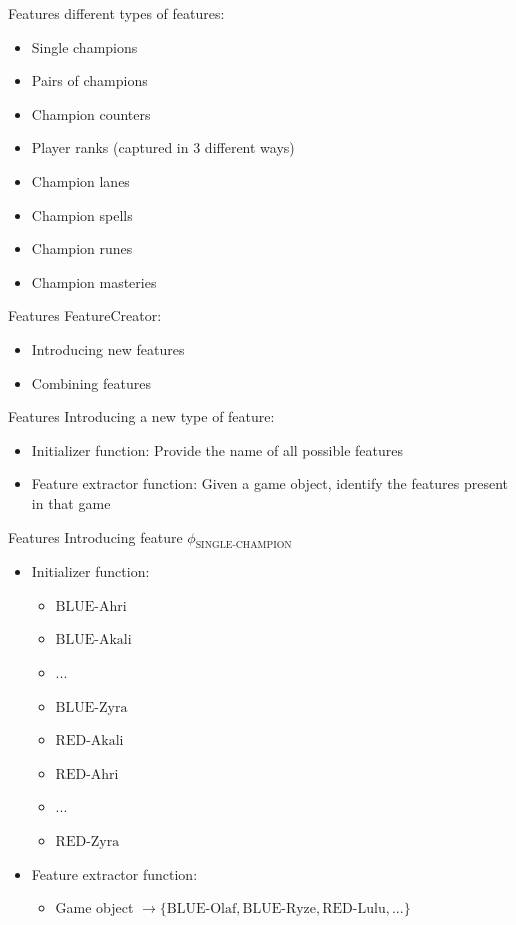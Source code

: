 \begin{frame}{Features}
 different types of features:\\
\begin{itemize}
\item Single champions
\item Pairs of champions
\item Champion counters
\item Player ranks (captured in 3 different ways)
\item Champion lanes
\item Champion spells
\item Champion runes
\item Champion masteries
\end{itemize}
\end{frame}


\begin{frame}{Features}
\centering
FeatureCreator:
\begin{itemize}
\item Introducing new features
\item Combining features
\end{itemize}
\end{frame}

\begin{frame}{Features}
Introducing a new type of feature:
\begin{itemize}
\item Initializer function: Provide the name of all possible features
\item Feature extractor function: Given a game object, identify the features present in that game
\end{itemize}
\end{frame}

\begin{frame}{Features}
Introducing feature $\phi_\text{SINGLE-CHAMPION}$
\begin{itemize}
\item Initializer function: 
	\begin{itemize}
	\item $\text{BLUE-Ahri}$
	\item $\text{BLUE-Akali}$
	\item ...
	\item $\text{BLUE-Zyra}$
	\item $\text{RED-Akali}$
	\item $\text{RED-Ahri}$
	\item ...
	\item $\text{RED-Zyra}$
	\end{itemize}
\item Feature extractor function:  
	\begin{itemize}
	\item Game object $\rightarrow \{\text{BLUE-Olaf}, \text{BLUE-Ryze}, \text{RED-Lulu}, ...\}$
	\end{itemize}
\end{itemize}
\end{frame}

